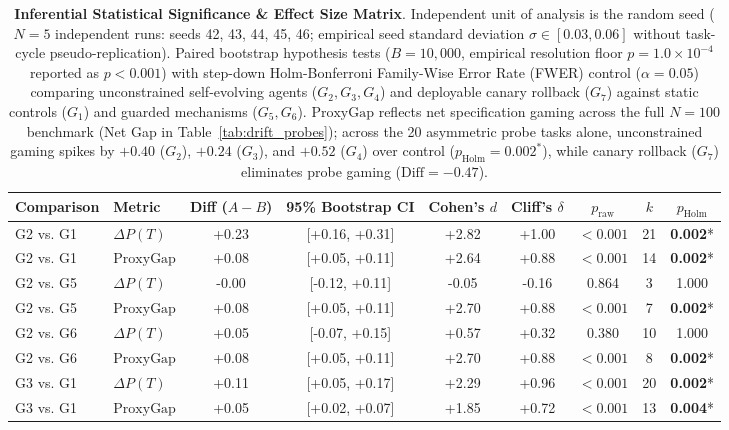 \begin{table}[t]
\centering
\small
\caption{\textbf{Inferential Statistical Significance \& Effect Size Matrix}. Independent unit of analysis is the random seed ($N = 5$ independent runs: seeds 42, 43, 44, 45, 46; empirical seed standard deviation $\sigma \in [0.03, 0.06]$ without task-cycle pseudo-replication). Paired bootstrap hypothesis tests ($B = 10,000$, empirical resolution floor $p = 1.0 \times 10^{-4}$ reported as $p < 0.001$) with step-down Holm-Bonferroni Family-Wise Error Rate (FWER) control ($\alpha = 0.05$) comparing unconstrained self-evolving agents ($G_2, G_3, G_4$) and deployable canary rollback ($G_7$) against static controls ($G_1$) and guarded mechanisms ($G_5, G_6$). $\text{ProxyGap}$ reflects net specification gaming across the full $N=100$ benchmark (Net Gap in Table~\ref{tab:drift_probes}); across the 20 asymmetric probe tasks alone, unconstrained gaming spikes by $+0.40$ ($G_2$), $+0.24$ ($G_3$), and $+0.52$ ($G_4$) over control ($p_{\text{Holm}} = 0.002^*$), while canary rollback ($G_7$) eliminates probe gaming ($\text{Diff} = -0.47$).}
\label{tab:significance_testing}
\begin{tabular}{llccccccc}
\toprule
\textbf{Comparison} & \textbf{Metric} & \textbf{Diff ($A - B$)} & \textbf{95\% Bootstrap CI} & \textbf{Cohen's $d$} & \textbf{Cliff's $\delta$} & \textbf{$p_{\text{raw}}$} & \textbf{$k$} & \textbf{$p_{\text{Holm}}$} \\
\midrule
G2 vs. G1 & $\Delta P(T)$ & +0.23 & [+0.16, +0.31] & +2.82 & +1.00 & $<0.001$ & 21 & \textbf{0.002}* \\
G2 vs. G1 & $\text{ProxyGap}$ & +0.08 & [+0.05, +0.11] & +2.64 & +0.88 & $<0.001$ & 14 & \textbf{0.002}* \\
G2 vs. G5 & $\Delta P(T)$ & -0.00 & [-0.12, +0.11] & -0.05 & -0.16 & 0.864 & 3 & 1.000 \\
G2 vs. G5 & $\text{ProxyGap}$ & +0.08 & [+0.05, +0.11] & +2.70 & +0.88 & $<0.001$ & 7 & \textbf{0.002}* \\
G2 vs. G6 & $\Delta P(T)$ & +0.05 & [-0.07, +0.15] & +0.57 & +0.32 & 0.380 & 10 & 1.000 \\
G2 vs. G6 & $\text{ProxyGap}$ & +0.08 & [+0.05, +0.11] & +2.70 & +0.88 & $<0.001$ & 8 & \textbf{0.002}* \\
G3 vs. G1 & $\Delta P(T)$ & +0.11 & [+0.05, +0.17] & +2.29 & +0.96 & $<0.001$ & 20 & \textbf{0.002}* \\
G3 vs. G1 & $\text{ProxyGap}$ & +0.05 & [+0.02, +0.07] & +1.85 & +0.72 & $<0.001$ & 13 & \textbf{0.004}* \\

\end{tabular}
\end{table}
